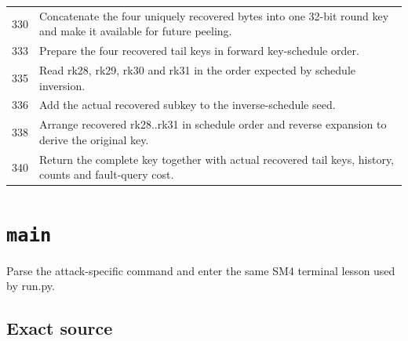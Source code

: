 \begin{longtable}{r >{\raggedright\arraybackslash}p{138mm}}
330&Concatenate the four uniquely recovered bytes into one 32-bit round key and make it available for future peeling.\\
333&Prepare the four recovered tail keys in forward key-schedule order.\\
335&Read rk28, rk29, rk30 and rk31 in the order expected by schedule inversion.\\
336&Add the actual recovered subkey to the inverse-schedule seed.\\
338&Arrange recovered rk28..rk31 in schedule order and reverse expansion to derive the original key.\\
340&Return the complete key together with actual recovered tail keys, history, counts and fault-query cost.\\
\bottomrule\end{longtable}\endgroup
\section{\texttt{main}}
Parse the attack-specific command and enter the same SM4 terminal lesson used by run.py.
\begin{center}\end{center}
\subsection*{Exact source}

